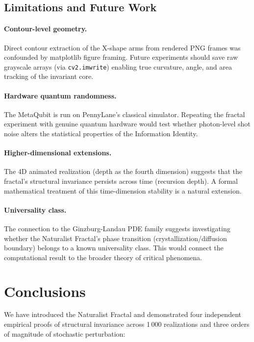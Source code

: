 \documentclass[twocolumn,amsmath,amssymb,prl]{revtex4-2}
\begin{document}
\subsection{Limitations and Future Work}

\paragraph{Contour-level geometry.}  Direct contour extraction of the X-shape
arms from rendered PNG frames was confounded by matplotlib figure framing.
Future experiments should save raw grayscale arrays (via \texttt{cv2.imwrite})
enabling true curvature, angle, and area tracking of the invariant core.

\paragraph{Hardware quantum randomness.}  The MetaQubit is run on PennyLane's
classical simulator.  Repeating the fractal experiment with genuine quantum
hardware would test whether photon-level shot noise alters the statistical
properties of the Information Identity.

\paragraph{Higher-dimensional extensions.}  The 4D animated realization
(depth as the fourth dimension) suggests that the fractal's structural
invariance persists across time (recursion depth).  A formal mathematical
treatment of this time-dimension stability is a natural extension.

\paragraph{Universality class.}  The connection to the Ginzburg-Landau PDE
family suggests investigating whether the Naturalist Fractal's phase
transition (crystallization/diffusion boundary) belongs to a known
universality class.  This would connect the computational result to the
broader theory of critical phenomena.

\section{Conclusions}
\label{sec:conclusions}

We have introduced the Naturalist Fractal and demonstrated four independent
empirical proofs of structural invariance across 1\,000 realizations and
three orders of magnitude of stochastic perturbation:
\end{document}
